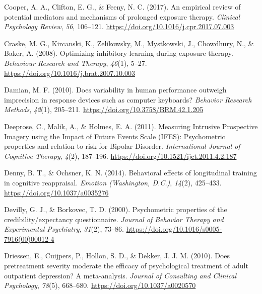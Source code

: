 \documentclass[
  man,floatsintext]{apa7}
\newlength{\cslhangindent}
\newlength{\cslentryspacingunit} %
\newenvironment{CSLReferences}[2] %
 {%
  \setlength{\parindent}{0pt}
  \ifodd #1
  \let\oldpar\par
  \def\par{\hangindent=\cslhangindent\oldpar}
  \fi
  \setlength{\parskip}{#2\cslentryspacingunit}
 }%
 {}
\begin{document}
\begin{CSLReferences}{1}{0}
\leavevmode{}%
Cooper, A. A., Clifton, E. G., \& Feeny, N. C. (2017). An empirical review of potential mediators and mechanisms of prolonged exposure therapy. \emph{Clinical Psychology Review}, \emph{56}, 106--121. \url{https://doi.org/10.1016/j.cpr.2017.07.003}

\leavevmode{}%
Craske, M. G., Kircanski, K., Zelikowsky, M., Mystkowski, J., Chowdhury, N., \& Baker, A. (2008). Optimizing inhibitory learning during exposure therapy. \emph{Behaviour Research and Therapy}, \emph{46}(1), 5--27. \url{https://doi.org/10.1016/j.brat.2007.10.003}

\leavevmode{}%
Damian, M. F. (2010). Does variability in human performance outweigh imprecision in response devices such as computer keyboards? \emph{Behavior Research Methods}, \emph{42}(1), 205--211. \url{https://doi.org/10.3758/BRM.42.1.205}

\leavevmode{}%
Deeprose, C., Malik, A., \& Holmes, E. A. (2011). Measuring Intrusive Prospective Imagery using the Impact of Future Events Scale (IFES): Psychometric properties and relation to risk for Bipolar Disorder. \emph{International Journal of Cognitive Therapy}, \emph{4}(2), 187--196. \url{https://doi.org/10.1521/ijct.2011.4.2.187}

\leavevmode{}%
Denny, B. T., \& Ochsner, K. N. (2014). Behavioral effects of longitudinal training in cognitive reappraisal. \emph{Emotion (Washington, D.C.)}, \emph{14}(2), 425--433. \url{https://doi.org/10.1037/a0035276}

\leavevmode{}%
Devilly, G. J., \& Borkovec, T. D. (2000). Psychometric properties of the credibility/expectancy questionnaire. \emph{Journal of Behavior Therapy and Experimental Psychiatry}, \emph{31}(2), 73--86. \url{https://doi.org/10.1016/s0005-7916(00)00012-4}

\leavevmode{}%
Driessen, E., Cuijpers, P., Hollon, S. D., \& Dekker, J. J. M. (2010). Does pretreatment severity moderate the efficacy of psychological treatment of adult outpatient depression? A meta-analysis. \emph{Journal of Consulting and Clinical Psychology}, \emph{78}(5), 668--680. \url{https://doi.org/10.1037/a0020570}


\end{CSLReferences}
\end{document}
